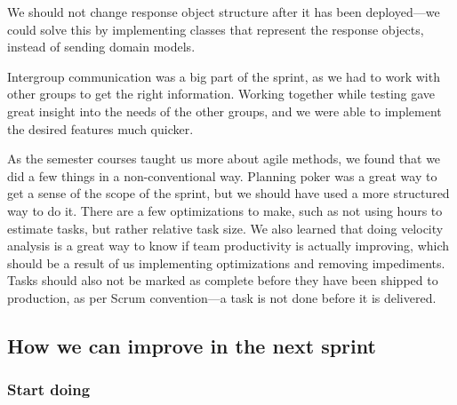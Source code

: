 We should not change response object structure after it has been deployed---we could solve this by implementing classes that represent the response objects, instead of sending domain models. 

Intergroup communication was a big part of the sprint, as we had to work with other groups to get the right information. Working together while testing gave great insight into the needs of the other groups, and we were able to implement the desired features much quicker.

As the semester courses taught us more about agile methods, we found that we did a few things in a non-conventional way. Planning poker was a great way to get a sense of the scope of the sprint, but we should have used a more structured way to do it. There are a few optimizations to make, such as not using hours to estimate tasks, but rather relative task size.
We also learned that doing velocity analysis is a great way to know if team productivity is actually improving, which should be a result of us implementing optimizations and removing impediments.
Tasks should also not be marked as complete before they have been shipped to production, as per Scrum convention---a task is not done before it is delivered.

\subsection{How we can improve in the next sprint}

\subsubsection{Start doing}

